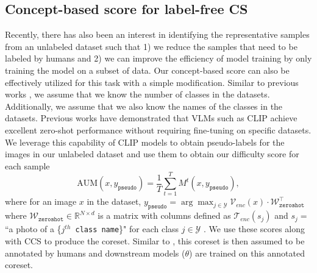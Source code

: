 \subsection{Concept-based score for label-free CS}
\label{sec:label_free_CS}
Recently, there has also been an interest \cite{zheng2024elfs, maharana2023d2, griffin2024zero} in identifying the representative samples from an unlabeled dataset such that 1) we reduce the samples that need to be labeled by humans and 2) we can improve the efficiency of model training by only training the model on a subset of data. 
Our concept-based score can also be effectively utilized for this task with a simple modification. 
Similar to previous works \cite{maharana2023d2,zheng2024elfs,sorscher2022beyond}, we assume that we know the number of classes in the datasets. Additionally, we assume that we also know the names of the classes in the datasets. %
Previous works have demonstrated that VLMs such as CLIP \cite{radford2021learning} achieve excellent zero-shot performance without requiring fine-tuning on specific datasets. 
We leverage this capability of CLIP models to obtain pseudo-labels for the images in our unlabeled dataset and use them to obtain our difficulty score for each sample %
\begin{equation}
\label{eq:aum_pseudo_label}
\mathrm{AUM}(x, y_{\texttt{pseudo}}) = \frac{1}{T} \sum_{t=1}^T M^t(x,y_{\texttt{pseudo}}),
\end{equation}
where for an image $x$ in the dataset, $y_{\texttt{pseudo}} = \arg \max_{j \in \mathcal{Y}} \mathcal{V}_{enc}(x) \cdot \mathcal{W}^\intercal_{\texttt{zeroshot}}$ where $\mathcal{W}_{\texttt{zeroshot}} \in \mathbb{R}^{N \times d}$ is a matrix with columns defined as $\mathcal{T}_{enc}(s_j)$ and $s_j = $ ``a photo of a \{\texttt{$j^{th}$ \texttt{class name}}\}" for each class $j \in \mathcal{Y}$ \cite{radford2021learning, wortsman2022robust}.
We use these scores along with CCS to produce the coreset. 
Similar to \cite{zheng2024elfs, maharana2023d2}, this coreset is then assumed to be annotated by humans and downstream models ($\theta$) are trained on this annotated coreset. %
